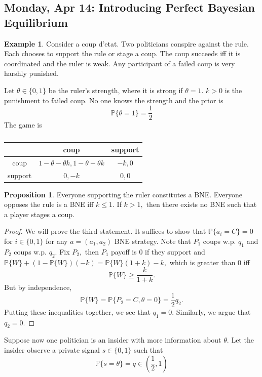 \documentclass[10pt, oneside]{article}
\newcommand{\bbP}{\mathbb{P}}
\theoremstyle{definition}
\newtheorem{exmp}{Example}[section]
\newtheorem{prop}{Proposition}
\begin{document}
\newpage
\subsection{Monday, Apr 14: Introducing Perfect Bayesian Equilibrium}
\begin{exmp}
    Consider a coup d'etat. Two politicians conspire against the rule. Each chooses to support the rule or stage a coup. The coup succeeds iff it is coordinated and the ruler is weak. Any participant of a failed coup is very harshly punished.  

    Let $\theta \in \{0,1\}$ be the ruler's strength, where it is strong if $\theta = 1.$ $k>0$ is the punishment to failed coup. No one knows the strength and the prior is 
    \[\bbP\{\theta = 1\} = \frac{1}{2}\] The game is 
                 \begin{table}[H]
        \centering
        \begin{tabular}{c|c|c}
             & coup & support\\
             \hline
             coup & $1- \theta - \theta k, 1-\theta -\theta k$ & $-k, 0$ \\
             \hline
             support &  $0, -k$& $0,0$\\
        \end{tabular}
        \caption{}
    \end{table}
    \begin{prop}
        Everyone supporting the ruler constitutes a BNE. Everyone opposes the rule  is a BNE iff $k\leq 1.$ If $k>1,$ then there exists no BNE such that a player stages a coup.
    \end{prop}
    \begin{proof}
        We will prove the third statement. It suffices to show that $\bbP\{a_i = C\} = 0$ for $i\in \{0,1\}$ for any $a = (a_1, a_2)$ BNE strategy. Note that $P_1$ coups w.p. $q_1$ and $P_2$ coups w.p. $q_2.$ Fix $P_2,$ then $P_1$ payoff is $0$ if they support and $ \bbP\{W\} + (1-\bbP\{W\})(-k)  = \bbP\{W\} (1 + k) - k,$ which is greater than $0$ iff
        \[\bbP\{W\}\geq \frac{k}{1+k}.\] But by independence,
        \[\bbP\{W\} = \bbP\{P_2 = C, \theta = 0\} = \frac{1}{2}q_2.\] Putting these inequalities together, we see that $q_1 = 0.$ Similarly, we argue that $q_2  = 0.$ 
    \end{proof}
    Suppose now one politician is an insider with more information about $\theta.$ Let the insider observe a private signal $s \in \{0,1\}$ such that 
    \[\bbP\{s = \theta\} = q \in (\frac{1}{2}, 1)\]

\end{exmp}
\end{document}
